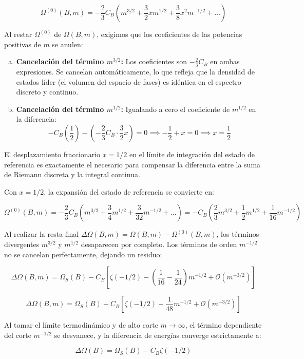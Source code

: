 $$ \Omega^{(0)}(B, m) = -\frac{2}{3} C_B \left( m^{3/2} + \frac{3}{2}x m^{1/2} + \frac{3}{8}x^2 m^{-1/2} + \dots \right) $$

Al restar $\Omega^{(0)}$ de $\Omega(B, m)$, exigimos que los coeficientes de las potencias positivas de $m$ se anulen:

\begin{enumerate}[a)]
    \item \textbf{Cancelación del término $m^{3/2}$:} Los coeficientes son $-\frac{2}{3}C_B$ en ambas expresiones. Se cancelan automáticamente, lo que refleja que la densidad de estados líder (el volumen del espacio de fases) es idéntica en el espectro discreto y continuo.
    \item \textbf{Cancelación del término $m^{1/2}$:} Igualando a cero el coeficiente de $m^{1/2}$ en la diferencia:
    $$ -C_B \left( \frac{1}{2} \right) - \left( -\frac{2}{3} C_B \cdot \frac{3}{2} x \right) = 0 \implies -\frac{1}{2} + x = 0 \implies x = \frac{1}{2} $$
\end{enumerate}

El desplazamiento fraccionario $x = 1/2$ en el límite de integración del estado de referencia es exactamente el necesario para compensar la diferencia entre la suma de Riemann discreta y la integral continua. 

Con $x = 1/2$, la expansión del estado de referencia se convierte en:

$$ \Omega^{(0)}(B, m) = -\frac{2}{3} C_B \left( m^{3/2} + \frac{3}{4}m^{1/2} + \frac{3}{32}m^{-1/2} + \dots \right) = -C_B \left( \frac{2}{3}m^{3/2} + \frac{1}{2}m^{1/2} + \frac{1}{16}m^{-1/2} \right) $$

Al realizar la resta final $\Delta\Omega(B, m) = \Omega(B, m) - \Omega^{(0)}(B, m)$, los términos divergentes $m^{3/2}$ y $m^{1/2}$ desaparecen por completo. Los términos de orden $m^{-1/2}$ no se cancelan perfectamente, dejando un residuo:

$$ \Delta\Omega(B, m) = \Omega_S(B) - C_B \left[ \zeta(-1/2) - \left( \frac{1}{16} - \frac{1}{24} \right) m^{-1/2} + \mathcal{O}(m^{-3/2}) \right] $$

$$ \Delta\Omega(B, m) = \Omega_S(B) - C_B \left[ \zeta(-1/2) - \frac{1}{48}m^{-1/2} + \mathcal{O}(m^{-3/2}) \right] $$

Al tomar el límite termodinámico y de alto corte $m \to \infty$, el término dependiente del corte $m^{-1/2}$ se desvanece, y la diferencia de energías converge estrictamente a:

$$ \Delta\Omega(B) = \Omega_S(B) - C_B \zeta(-1/2) $$

